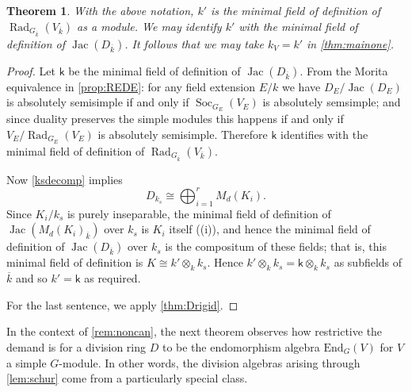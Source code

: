 \documentclass[11pt,reqno]{amsart}
\newtheorem{theorem}[lemma]{Theorem}
\theoremstyle{definition}
\theoremstyle{remark}
\theoremstyle{definition}
\theoremstyle{plain}
\DeclareMathOperator{\Rad}{Rad}
\DeclareMathOperator{\Soc}{Soc}
\DeclareMathOperator{\Jac}{Jac}
\newcommand{\End}{\mathrm{End}}
\newcommand{\ks}{\mathsf{k}}
\newcommand{\bark}{{\overline{k}}}
\begin{document}
\begin{theorem}
  With the above notation, $k'$ is the minimal field of definition of $\Rad_{G_\bark}(V_\bark)$ as a module. We may identify $k'$ with the minimal field of definition of $\Jac(D_\bark)$. It follows that we may take $k_V=k'$ in \cref{thm:mainone}.
  \end{theorem}
  \begin{proof}
    Let $\ks$ be the minimal field of definition of $\Jac(D_\bark)$. From the Morita equivalence in \cref{prop:REDE}: for any field extension $E/k$ we have $D_E/\Jac(D_E)$ is absolutely semisimple if and only if $\Soc_{G_E}(V_{E})$ is absolutely semsimple; and since duality preserves the simple modules this happens if and only if $V_E/\Rad_{G_E}(V_E)$ is absolutely semisimple. Therefore $\ks$ identifies with the minimal field of definition of $\Rad_{G_\bark}(V_\bark)$.

Now \eqref{ksdecomp} implies
  \begin{equation}
    D_{k_s} \cong \bigoplus_{i=1}^r M_d(K_i).  \label{eq:ksdecomp}
  \end{equation}
  Since $K_i/k_s$ is purely inseparable, the minimal field of definition of $\Jac(M_d(K_i)_\bark)$ over $k_s$ is $K_i$ itself ((i)), and hence the minimal 
  field of definition of $\Jac(D_\bark)$ over $k_s$ is the compositum of these fields; that is, this minimal field of definition is $K\cong k'\otimes_k k_s$. Hence $k'\otimes_k k_s =\ks\otimes_k k_s$ as subfields of $\bark$ and so $k'=\ks$ as required. 
  
  For the last sentence, we apply \cref{thm:Drigid}.
  \end{proof}

In the context of \cref{rem:noncan}, the next theorem observes how restrictive the demand is for a division ring $D$ to be the endomorphism algebra $\End_G(V)$ for $V$ a simple $G$-module. In other words, the division algebras arising through \cref{lem:schur} come from a particularly special class.
\end{document}
